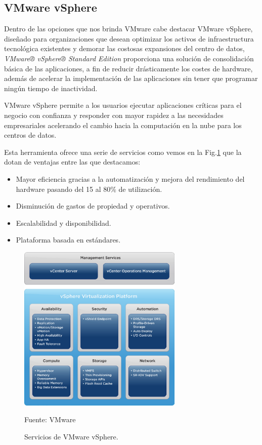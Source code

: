 \subsection{VMware vSphere}
Dentro de las opciones que nos brinda VMware cabe destacar VMware vSphere, diseñado para organizaciones que desean optimizar los activos de infraestructura
tecnológica existentes y demorar las costosas expansiones del centro de datos,
\textit{VMware® vSphere® Standard Edition} proporciona una solución de consolidación básica de las aplicaciones, a fin de reducir drásticamente los costes de hardware, además de acelerar la implementación de las aplicaciones sin tener que programar ningún tiempo de inactividad.

VMware vSphere permite a los usuarios ejecutar aplicaciones críticas para el negocio con confianza y responder con mayor rapidez a las necesidades empresariales acelerando el cambio hacia la computación en la nube para los centros de datos.

Esta herramienta ofrece una serie de servicios \cite{noauthor_vmware-vsphere-datasheet.pdf_nodate} como vemos en la Fig.\ref{VMware} que la dotan de ventajas entre las que destacamos:

\begin{itemize}
\item Mayor eficiencia gracias a la automatización y mejora del rendimiento del hardware pasando del 15 al 80\% de utilización.
\item Disminución de gastos de propiedad y operativos.
\item Escalabilidad y disponibilidad.
\item Plataforma basada en estándares.
\end{itemize}

\begin{figure}
    \centering
    \includegraphics[width=0.7\textwidth]{imagenes/capitulo2/VMware.png}
    \caption{Servicios de VMware vSphere.}
	\vspace{0.3cm}
    \footnotesize{Fuente: VMware}
    \label{VMware}
\end{figure}

